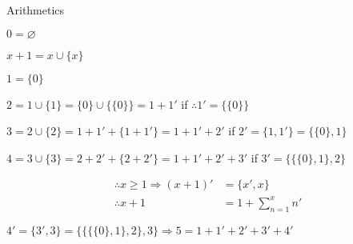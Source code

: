 \documentclass[10pt,a4paper]{article}
\begin{document}
		\Large
		Arithmetics
		\normalsize

		\vspace{3mm}

		$0 = \varnothing$

		$x + 1 = x \cup \{x\}$

		$1 = \{0\}$

		$2 = 1 \cup \{1\} = \{0\} \cup \{\{0\}\} = 1 + 1'$ if $\therefore 1' = \{\{0\}\}$

		$3 = 2 \cup \{2\} = 1 + 1' + \{1 + 1'\} = 1 + 1' + 2'$ if $2' = \{1, 1'\} = \{\{0\}, 1\}$

		$4 = 3 \cup \{3\} = 2 + 2' + \{2 + 2'\} = 1 + 1' + 2' + 3'$ if $3' = \{\{\{0\}, 1\}, 2\}$

		\begin{align*}
		\therefore x \ge 1 \Rightarrow (x + 1)' &= \{ x', x \} \\
		\therefore x + 1 &= 1 + \sum_{n = 1}^x n'
		\end{align*}

		$4' = \{3', 3\} = \{\{\{\{0\}, 1\}, 2\}, 3\} \Rightarrow 5 = 1 + 1' + 2' + 3' + 4'$
\end{document}

